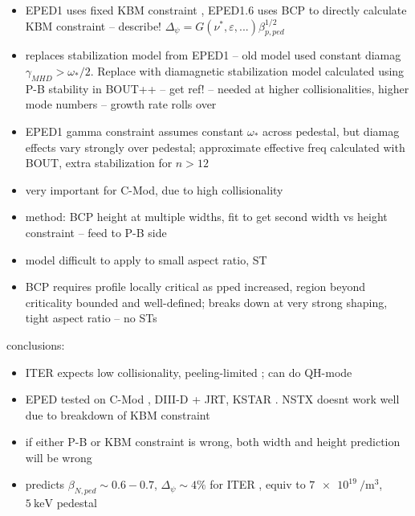 \begin{itemize}
 \item EPED1 uses fixed KBM constraint \cite{Snyder2009}, EPED1.6  uses BCP to directly calculate KBM constraint \cite{Snyder2010,Snyder2011} -- describe! $\Delta_\psi = G(\nu^*,\varepsilon,...) \beta_{p,ped}^{1/2}$
 \item replaces stabilization model from EPED1 -- old model used constant diamag $\gamma_{MHD} > \omega_*/2$.  Replace with diamagnetic stabilization model calculated using P-B stability in BOUT++ -- get ref! \cite{Snyder2010,Snyder2011} -- needed at higher collisionalities, higher mode numbers -- growth rate rolls over
 \item EPED1 gamma constraint assumes constant $\omega_*$ across pedestal, but diamag effects vary strongly over pedestal; approximate effective freq calculated with BOUT, extra stabilization for $n>12$ \cite{Snyder2011}
 \item very important for C-Mod, due to high collisionality \cite{Snyder2011}
 \item method: BCP height at multiple widths, fit to get second width vs height constraint -- feed to P-B side
 \item model difficult to apply to small aspect ratio, ST \cite{Snyder2009a}
 \item BCP requires profile locally critical as pped increased, region beyond criticality bounded and well-defined; breaks down at very strong shaping, tight aspect ratio -- no STs \cite{Snyder2011}
\end{itemize}

conclusions:
\begin{itemize}
 \item ITER expects low collisionality, peeling-limited \cite{Snyder2012}; can do QH-mode \cite{Snyder2011}
 \item EPED tested on C-Mod \cite{Walk2012}, DIII-D \cite{Groebner2013} + JRT, KSTAR \cite{Han2013}.  NSTX doesnt work well due to breakdown of KBM constraint \cite{Groebner2013}
 \item if either P-B or KBM constraint is wrong, both width and height prediction will be wrong \cite{Snyder2009a}
 \item predicts $\beta_{N,ped} \sim 0.6-0.7$, $\Delta_\psi \sim 4\%$ for ITER \cite{Snyder2009a}, equiv to $\SI{7e19}{\per\meter\cubed}$, $\SI{5}{\kilo\electronvolt}$ pedestal \cite{Snyder2009a}
\end{itemize}

\nicechapterending


